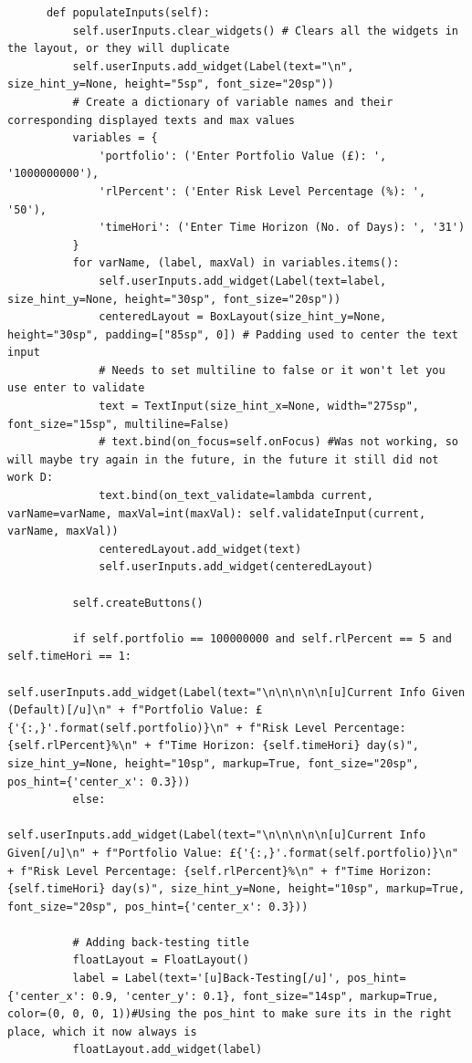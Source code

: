 \documentclass{article}
\begin{document}
\begin{verbatim}
      def populateInputs(self):
          self.userInputs.clear_widgets() # Clears all the widgets in the layout, or they will duplicate
          self.userInputs.add_widget(Label(text="\n", size_hint_y=None, height="5sp", font_size="20sp"))
          # Create a dictionary of variable names and their corresponding displayed texts and max values
          variables = {
              'portfolio': ('Enter Portfolio Value (£): ', '1000000000'),
              'rlPercent': ('Enter Risk Level Percentage (%): ', '50'),
              'timeHori': ('Enter Time Horizon (No. of Days): ', '31')
          }
          for varName, (label, maxVal) in variables.items():
              self.userInputs.add_widget(Label(text=label, size_hint_y=None, height="30sp", font_size="20sp"))
              centeredLayout = BoxLayout(size_hint_y=None, height="30sp", padding=["85sp", 0]) # Padding used to center the text input
              # Needs to set multiline to false or it won't let you use enter to validate         
              text = TextInput(size_hint_x=None, width="275sp", font_size="15sp", multiline=False)
              # text.bind(on_focus=self.onFocus) #Was not working, so will maybe try again in the future, in the future it still did not work D:
              text.bind(on_text_validate=lambda current, varName=varName, maxVal=int(maxVal): self.validateInput(current, varName, maxVal))
              centeredLayout.add_widget(text)
              self.userInputs.add_widget(centeredLayout)
          
          self.createButtons()
          
          if self.portfolio == 100000000 and self.rlPercent == 5 and self.timeHori == 1:
              self.userInputs.add_widget(Label(text="\n\n\n\n\n[u]Current Info Given (Default)[/u]\n" + f"Portfolio Value: £{'{:,}'.format(self.portfolio)}\n" + f"Risk Level Percentage: {self.rlPercent}%\n" + f"Time Horizon: {self.timeHori} day(s)", size_hint_y=None, height="10sp", markup=True, font_size="20sp", pos_hint={'center_x': 0.3}))
          else:
              self.userInputs.add_widget(Label(text="\n\n\n\n\n[u]Current Info Given[/u]\n" + f"Portfolio Value: £{'{:,}'.format(self.portfolio)}\n" + f"Risk Level Percentage: {self.rlPercent}%\n" + f"Time Horizon: {self.timeHori} day(s)", size_hint_y=None, height="10sp", markup=True, font_size="20sp", pos_hint={'center_x': 0.3}))

          # Adding back-testing title
          floatLayout = FloatLayout()
          label = Label(text='[u]Back-Testing[/u]', pos_hint={'center_x': 0.9, 'center_y': 0.1}, font_size="14sp", markup=True, color=(0, 0, 0, 1))#Using the pos_hint to make sure its in the right place, which it now always is
          floatLayout.add_widget(label)


\end{verbatim}
\end{document}
